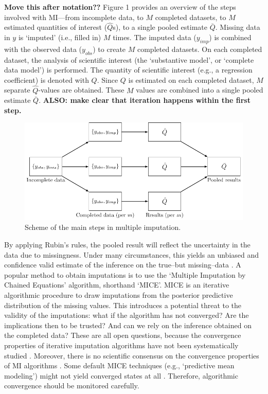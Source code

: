\documentclass[Royal,times,sageh]{sagej}
\begin{document}
\textbf{Move this after notation??} Figure 1 provides an overview of the
steps involved with MI---from incomplete data, to \(M\) completed
datasets, to \(M\) estimated quantities of interest (\(\hat{Q}\)s), to a
single pooled estimate \(\bar{Q}\). Missing data in \(y\) is `imputed'
(i.e., filled in) \(M\) times. The imputed data (\(y_{imp}\)) is
combined with the observed data (\(y_{obs}\)) to create \(M\) completed
datasets. On each completed dataset, the analysis of scientific interest
(the `substantive model', or `complete data model') is performed. The
quantity of scientific interest (e.g., a regression coefficient) is
denoted with \(Q\). Since \(Q\) is estimated on each completed dataset,
\(M\) separate \(\hat{Q}\)-values are obtained. These \(M\) values are
combined into a single pooled estimate \(\bar{Q}\). \textbf{ALSO: make
clear that iteration happens within the first step.}

\begin{figure}

{\centering \includegraphics[width=\linewidth]{./images/diagram} 

}

\caption{Scheme of the main steps in multiple imputation.}\label{fig:unnamed-chunk-1}
\end{figure}

By applying Rubin's rules, the pooled result will reflect the
uncertainty in the data due to missingness. Under many circumstances,
this yields an unbiased and confidence valid estimate of the inference
on the true--but missing--data \citep{buur18}. A popular method to
obtain imputations is to use the `Multiple Imputation by Chained
Equations' algorithm, shorthand `MICE'\citep{mice}. MICE is an iterative
algorithmic procedure to draw imputations from the posterior predictive
distribution of the missing values. This introduces a potential threat
to the validity of the imputations: what if the algorithm has not
converged? Are the implications then to be trusted? And can we rely on
the inference obtained on the completed data? These are all open
questions, because the convergence properties of iterative imputation
algorithms have not been systematically studied \citep{buur18}.
Moreover, there is no scientific consensus on the convergence properties
of MI algorithms \citep{taka17}. Some default MICE techniques (e.g.,
`predictive mean modeling') might not yield converged states at all
\citep{murr18}. Therefore, algorithmic convergence should be monitored
carefully.
\end{document}

